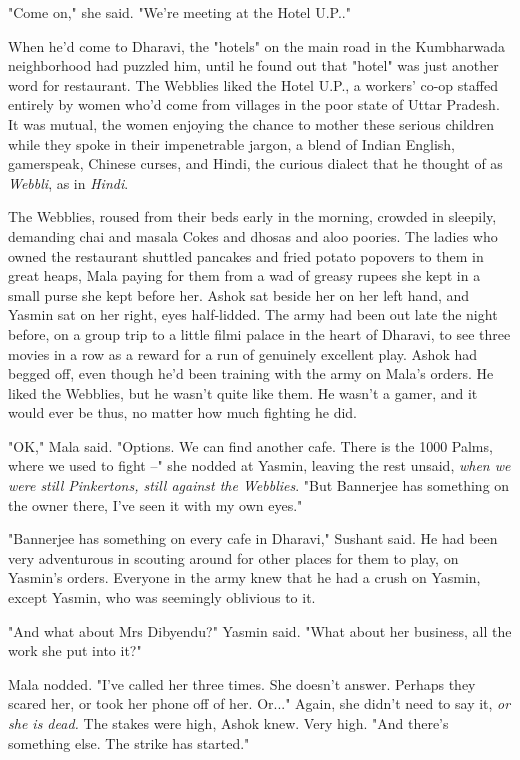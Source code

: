 "Come on," she said. "We're meeting at the Hotel U.P.."

When he'd come to Dharavi, the "hotels" on the main road in the
Kumbharwada neighborhood had puzzled him, until he found out that
"hotel" was just another word for restaurant. The Webblies liked
the Hotel U.P., a workers' co-op staffed entirely by women who'd
come from villages in the poor state of Uttar Pradesh. It was
mutual, the women enjoying the chance to mother these serious
children while they spoke in their impenetrable jargon, a blend of
Indian English, gamerspeak, Chinese curses, and Hindi, the curious
dialect that he thought of as \emph{Webbli}, as in \emph{Hindi}.

The Webblies, roused from their beds early in the morning, crowded
in sleepily, demanding chai and masala Cokes and dhosas and aloo
poories. The ladies who owned the restaurant shuttled pancakes and
fried potato popovers to them in great heaps, Mala paying for them
from a wad of greasy rupees she kept in a small purse she kept
before her. Ashok sat beside her on her left hand, and Yasmin sat
on her right, eyes half-lidded. The army had been out late the
night before, on a group trip to a little filmi palace in the heart
of Dharavi, to see three movies in a row as a reward for a run of
genuinely excellent play. Ashok had begged off, even though he'd
been training with the army on Mala's orders. He liked the
Webblies, but he wasn't quite like them. He wasn't a gamer, and it
would ever be thus, no matter how much fighting he did.

"OK," Mala said. "Options. We can find another cafe. There is the
1000 Palms, where we used to fight --" she nodded at Yasmin,
leaving the rest unsaid,
\emph{when we were still Pinkertons, still against the Webblies}.
"But Bannerjee has something on the owner there, I've seen it with
my own eyes."

"Bannerjee has something on every cafe in Dharavi," Sushant said.
He had been very adventurous in scouting around for other places
for them to play, on Yasmin's orders. Everyone in the army knew
that he had a crush on Yasmin, except Yasmin, who was seemingly
oblivious to it.

"And what about Mrs Dibyendu?" Yasmin said. "What about her
business, all the work she put into it?"

Mala nodded. "I've called her three times. She doesn't answer.
Perhaps they scared her, or took her phone off of her. Or..."
Again, she didn't need to say it, \emph{or she is dead.} The stakes
were high, Ashok knew. Very high. "And there's something else. The
strike has started."

